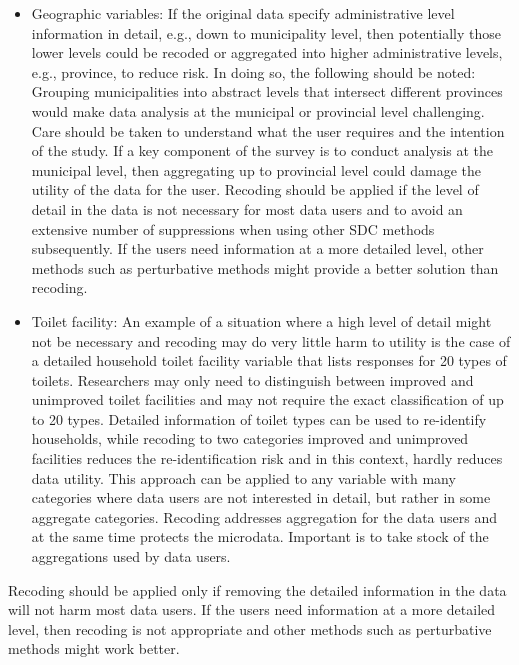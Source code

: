 \documentclass[letterpaper,10pt,english]{sphinxmanual}
\begin{document}
\begin{itemize}
\item {} 
Geographic variables: If the original data specify administrative
level information in detail, e.g., down to municipality level, then
potentially those lower levels could be recoded or aggregated into
higher administrative levels, e.g., province, to reduce risk. In
doing so, the following should be noted: Grouping municipalities into
abstract levels that intersect different provinces would make data
analysis at the municipal or provincial level challenging. Care
should be taken to understand what the user requires and the
intention of the study. If a key component of the survey is to
conduct analysis at the municipal level, then aggregating up to
provincial level could damage the utility of the data for the user.
Recoding should be applied if the level of detail in the data is not
necessary for most data users and to avoid an extensive number of
suppressions when using other SDC methods subsequently. If the users
need information at a more detailed level, other methods such as
perturbative methods might provide a better solution than recoding.

\item {} 
Toilet facility: An example of a situation where a high level of
detail might not be necessary and recoding may do very little harm to
utility is the case of a detailed household toilet facility variable
that lists responses for 20 types of toilets. Researchers may only
need to distinguish between improved and unimproved toilet facilities
and may not require the exact classification of up to 20 types.
Detailed information of toilet types can be used to re-identify
households, while recoding to two categories \textendash{} improved and
unimproved facilities \textendash{} reduces the re-identification risk and in
this context, hardly reduces data utility. This approach can be
applied to any variable with many categories where data users are not
interested in detail, but rather in some aggregate categories.
Recoding addresses aggregation for the data users and at the same
time protects the microdata. Important is to take stock of the
aggregations used by data users.

\end{itemize}

Recoding should be applied only if removing the detailed information in
the data will not harm most data users. If the users need information at
a more detailed level, then recoding is not appropriate and other
methods such as perturbative methods might work better.
\end{document}
